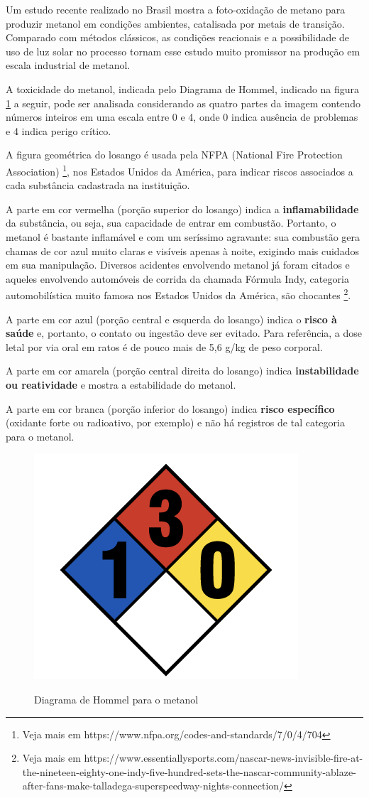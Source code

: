 Um estudo recente realizado no Brasil \cite{D2CC01757A} mostra a foto-oxidação de metano para produzir metanol em condições ambientes, catalisada por metais de transição. Comparado com métodos clássicos, as condições reacionais e a possibilidade de uso de luz solar no processo tornam esse estudo muito promissor na produção em escala industrial de metanol.

A toxicidade do metanol, indicada pelo Diagrama de Hommel, indicado na figura \ref{fig:hommel} a seguir, pode ser analisada considerando as quatro partes da imagem contendo números inteiros em uma escala entre 0 e 4, onde 0 indica ausência de problemas e 4 indica perigo crítico.

A figura geométrica do losango é usada pela NFPA (National Fire Protection Association) \footnote{Veja mais em https://www.nfpa.org/codes-and-standards/7/0/4/704}, nos Estados Unidos da América, para indicar riscos associados a cada substância cadastrada na instituição.

A parte em cor vermelha (porção superior do losango) indica a \textbf{inflamabilidade} da substância, ou seja, sua capacidade de entrar em combustão. Portanto, o metanol é bastante inflamável e com um seríssimo agravante: sua combustão gera chamas de cor azul muito claras e visíveis apenas à noite, exigindo mais cuidados em sua manipulação. Diversos acidentes envolvendo metanol já foram citados e aqueles envolvendo automóveis de corrida da chamada Fórmula Indy, categoria automobilística muito famosa nos Estados Unidos da América, são chocantes \footnote{Veja mais em https://www.essentiallysports.com/nascar-news-invisible-fire-at-the-nineteen-eighty-one-indy-five-hundred-sets-the-nascar-community-ablaze-after-fans-make-talladega-superspeedway-nights-connection/}.

A parte em cor azul (porção central e esquerda do losango) indica o \textbf{risco à saúde} e, portanto, o contato ou ingestão deve ser evitado. Para referência, a dose letal por via oral em ratos é de pouco mais de 5,6 g/kg de peso corporal.

A parte em cor amarela (porção central direita do losango) indica \textbf{instabilidade ou reatividade} e mostra a estabilidade do metanol.

A parte em cor branca (porção inferior do losango) indica \textbf{risco específico} (oxidante forte ou radioativo, por exemplo) e não há registros de tal categoria para o metanol.


\begin{figure}[h]
    \centering
    \caption{Diagrama de Hommel para o metanol}
    \vspace{0.5cm}
    \includegraphics[width=0.25\linewidth]{imagens/hommel.png}
\label{fig:hommel}
\end{figure}

